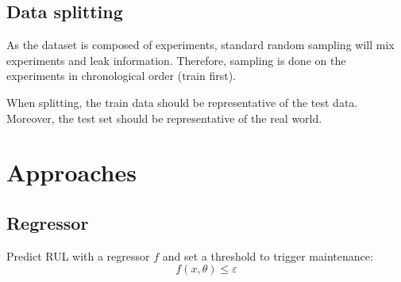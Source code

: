 \subsection{Data splitting}

As the dataset is composed of experiments, standard random sampling will mix experiments and leak information. Therefore, sampling is done on the experiments in chronological order (train first).

\begin{remark}
    When splitting, the train data should be representative of the test data. Moreover, the test set should be representative of the real world.
\end{remark}


\section{Approaches}


\subsection{Regressor}

Predict RUL with a regressor $f$ and set a threshold to trigger maintenance:
\[ f(x, \theta) \leq \varepsilon \]
